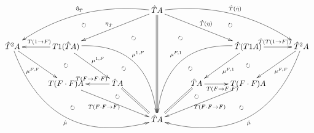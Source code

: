 \documentclass[12pt]{article}
\begin{document}
\pagestyle{empty}

\begin{align*}
  \vcenter{
    \xymatrix@=30pt{
      & & &
      \hat{T} A \ar@{=}[ddd]
      \ar@{->}[lld]_{\eta_{\hat{T}}}
      \ar@/_20pt/@{->}[llld]_{\hat{\eta}_{\hat{T}}}
      \ar@/_5pt/@{{}{ }{}}[llld]|{\circlearrowright}
      \ar@/_40pt/@{{}{ }{}}[ddd]|(0.25){\circlearrowright}
      \ar@{->}[rrd]^{\hat{T}(\eta)}
      \ar@/^20pt/@{->}[rrrd]^{\hat{T}(\hat{\eta})}
      \ar@/^5pt/@{{}{ }{}}[rrrd]|{\circlearrowright}
      \ar@/^40pt/@{{}{ }{}}[ddd]|(0.25){\circlearrowright}
      \\
      \hat{T}^2 A
      \ar@{->}[rd]_{\mu^{F,F}}
      \ar@/_50pt/@{->}[rrrdd]_{\hat{\mu}}
      \ar@/_35pt/@{{}{ }{}}[rrrdd]|{\circlearrowright}
      &
      T 1 (\hat{T} A)
      \ar@{->}[l]_{T (1 \to F)}
      \ar@/^40pt/@{->}[rrdd]^{\mu^{1,F}}
      \ar@/^25pt/@{{}{ }{}}[rrdd]|{\circlearrowright}
      \ar@{->}[rd]^{\mu^{1,F}}
      \ar@{{}{ }{}}[d]|{\circlearrowright}
      & & & &
      \hat{T} (T 1 A)
      \ar@{->}[r]^{\hat{T}(T (1 \to F))}
      \ar@/_40pt/@{->}[lldd]_{\mu^{F,1}}
      \ar@/_25pt/@{{}{ }{}}[lldd]|{\circlearrowright}
      \ar@{->}[ld]^{\mu^{F,1}}
      \ar@{{}{ }{}}[d]|{\circlearrowright}
      &
      \hat{T}^2 A
      \ar@{->}[ld]^{\mu^{F,F}}
      \ar@/^50pt/@{->}[llldd]^{\hat{\mu}}
      \ar@/^35pt/@{{}{ }{}}[llldd]|{\circlearrowright}
      \\
      &
      T (F \cdot F) A
      \ar@{->}[rrd]_{T (F \cdot F \to F)}
      &
      \hat{T} A
      \ar@{->}[l]_{T (F \to F \cdot F)}
      \ar@{=}[rd]
      \ar@{{}{ }{}}[d]|(0.35){\circlearrowright}
      & &
      \hat{T} A
      \ar@{->}[r]_{T (F \to F \cdot F)}
      \ar@{=}[ld]
      \ar@{{}{ }{}}[d]|(0.35){\circlearrowright}
      &
      T (F \cdot F) A
      \ar@{->}[lld]^{T (F \cdot F \to F)}
      \\
      & & &
      \hat{T} A
      &
    }
  }
\end{align*}
\end{document}
